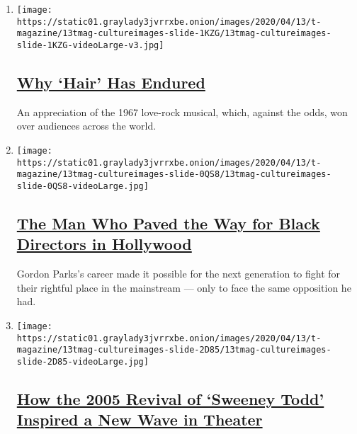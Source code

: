 \begin{enumerate}
\def\labelenumi{\arabic{enumi}.}
\item
  \texttt{[image: https://static01.graylady3jvrrxbe.onion/images/2020/04/13/t-magazine/13tmag-cultureimages-slide-1KZG/13tmag-cultureimages-slide-1KZG-videoLarge-v3.jpg]}

  \hypertarget{why-hair-has-endured}{%
  \subsection{\texorpdfstring{\href{/interactive/2020/04/13/t-magazine/hair-musical-broadway.html}{Why
  `Hair' Has
  Endured}}{Why `Hair' Has Endured}}\label{why-hair-has-endured}}

  An appreciation of the 1967 love-rock musical, which, against the
  odds, won over audiences across the world.
\item
  \texttt{[image: https://static01.graylady3jvrrxbe.onion/images/2020/04/13/t-magazine/13tmag-cultureimages-slide-0QS8/13tmag-cultureimages-slide-0QS8-videoLarge.jpg]}

  \hypertarget{the-man-who-paved-the-way-for-black-directors-in-hollywood}{%
  \subsection{\texorpdfstring{\href{/interactive/2020/04/13/t-magazine/gordon-parks.html}{The
  Man Who Paved the Way for Black Directors in
  Hollywood}}{The Man Who Paved the Way for Black Directors in Hollywood}}\label{the-man-who-paved-the-way-for-black-directors-in-hollywood}}

  Gordon Parks's career made it possible for the next generation to
  fight for their rightful place in the mainstream --- only to face the
  same opposition he had.
\item
  \texttt{[image: https://static01.graylady3jvrrxbe.onion/images/2020/04/13/t-magazine/13tmag-cultureimages-slide-2D85/13tmag-cultureimages-slide-2D85-videoLarge.jpg]}

  \hypertarget{how-the-2005-revival-of-sweeney-todd-inspired-a-new-wave-in-theater}{%
  \subsection{\texorpdfstring{\href{/interactive/2020/04/13/t-magazine/sweeney-todd-revival.html}{How
  the 2005 Revival of `Sweeney Todd' Inspired a New Wave in
  Theater}}{How the 2005 Revival of `Sweeney Todd' Inspired a New Wave in Theater}}\label{how-the-2005-revival-of-sweeney-todd-inspired-a-new-wave-in-theater}}


\end{enumerate}
